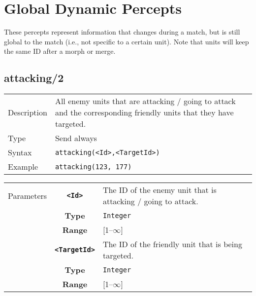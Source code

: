 \section{Global Dynamic Percepts}
These percepts represent information that changes during a match, but is still global to the match (i.e., not specific to a certain unit). Note that units will keep the same ID after a morph or merge.

\subsection{attacking/2}
\begin{tabularx}{\textwidth}{lX}
 Description & All enemy units that are attacking / going to attack and the corresponding friendly units  that they have targeted. \\
 Type & Send always \\
 Syntax & \verb|attacking(<Id>,<TargetId>)| \\
 Example & \verb|attacking(123, 177)| \\
 \end{tabularx}
 \begin{tabularx}{\textwidth}{l | c | p{8cm}|}
 \cline{2-3}
 Parameters & \textbf{\verb|<Id>|} & The ID of the enemy unit that is attacking / going to attack. \\
            & \textbf{Type} & \verb|Integer| \\
            & \textbf{Range} & [1--$\infty$] \\
            \cline{2-3}
            & \textbf{\verb|<TargetId>|} & The ID of the friendly unit that is being targeted. \\
            & \textbf{Type} & \verb|Integer| \\
            & \textbf{Range} & [1--$\infty$] \\
            \cline{2-3}
\end{tabularx}

